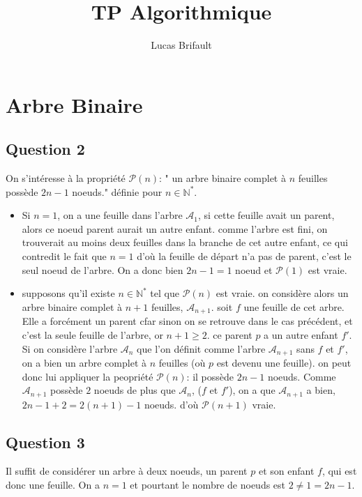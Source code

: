 \documentclass{article}
\title{TP Algorithmique}
\begin{document}
\author{Lucas Brifault}
\maketitle
\section*{Arbre Binaire}
\subsection*{Question 2}
On s'intéresse à la propriété $\mathcal{P}(n)$: " un arbre binaire complet à $n$ feuilles possède $2n-1$ noeuds." définie pour $n \in \mathbb{N}^*$.\\
\begin{itemize}
\item Si $n = 1$, on a une feuille dans l'arbre $\mathcal{A}_1$, si cette feuille avait un parent, alors ce noeud parent aurait un autre enfant. comme l'arbre est fini, on trouverait au moins deux feuilles dans la branche de cet autre enfant, ce qui contredit le fait que $n = 1$ d'où la feuille de départ n'a pas de parent, c'est le seul noeud de l'arbre. On a donc bien $2n-1 = 1$ noeud et $\mathcal{P}(1)$ est vraie.\\
\item supposons qu'il existe $n \in \mathbb{N}^*$ tel que $\mathcal{P}(n)$ est vraie. on considère alors un arbre binaire complet à $n+1$ feuilles, $\mathcal{A}_{n+1}$. soit $f$ une feuille de cet arbre. Elle a forcément un parent cfar sinon on se retrouve dans le cas précédent, et c'est la seule feuille de l'arbre, or $n+1\geq 2$. ce parent $p$ a un autre enfant $f'$. Si on considère l'arbre $\mathcal{A}_n$ que l'on définit comme l'arbre $\mathcal{A}_{n+1}$ sans $f$ et $f'$, on a bien un arbre complet à $n$ feuilles (où $p$ est devenu une feuille). on peut donc lui appliquer la peopriété $\mathcal{P}(n)$: il possède $2n-1$ noeuds. Comme $\mathcal{A}_{n+1}$ possède $2$ noeuds de plus que $\mathcal{A}_n$, ($f$ et $f'$), on a que $\mathcal{A}_{n+1}$ a bien, $2n-1+2 = 2(n+1)-1$ noeuds. d'où $\mathcal{P}(n+1)$ vraie.
\end{itemize}
\subsection*{Question 3}
Il suffit de considérer un arbre à deux noeuds, un parent $p$ et son enfant $f$, qui est donc une feuille. On a $n = 1$ et pourtant le nombre de noeuds est $2 \neq 1 = 2n-1$. 
\end{document}
